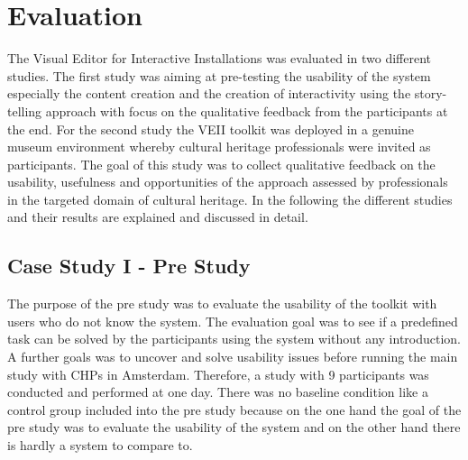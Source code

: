 
\chapter{Evaluation}
\label{chap:casestudies}

The Visual Editor for Interactive Installations was evaluated in two different studies. The first study was aiming at pre-testing the usability of the system especially the content creation and the creation of interactivity using the story-telling approach with focus on the qualitative feedback from the participants at the end. 
For the second study the VEII toolkit was deployed in a genuine museum environment whereby cultural heritage professionals were invited as participants. The goal of this study was to collect qualitative feedback on the usability, usefulness and opportunities of the approach assessed by professionals in the targeted domain of cultural heritage.
In the following the different studies and their results are explained and discussed in detail.

\section{Case Study I - Pre Study}
The purpose of the pre study was to evaluate the usability of the toolkit with users who do not know the system. The evaluation goal was to see if a predefined task can be solved by the participants using the system without any introduction. A further goals was to uncover and solve usability issues before running the main study with CHPs in Amsterdam. Therefore, a study with 9 participants was conducted and performed at one day. There was no baseline condition like a control group included into the pre study because on the one hand the goal of the pre study was to evaluate the usability of the system and on the other hand there is hardly a system to compare to. 

